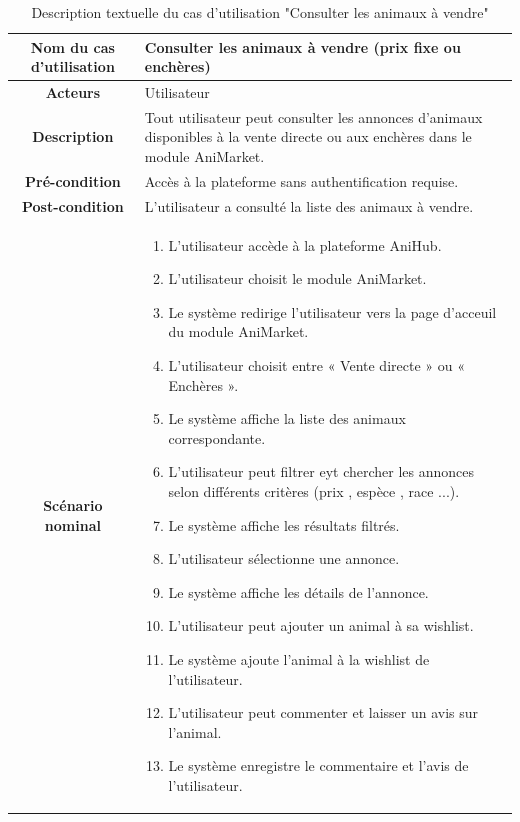 \begin{longtable}{|c|p{11cm}|}
\caption{Description textuelle du cas d’utilisation "Consulter les animaux à vendre"}
\label{tab:consulter_animaux_vente} \\
\hline
\cellcolor{coloranimarket} \textbf{Nom du cas d'utilisation } & Consulter les animaux à vendre (prix fixe ou enchères) \\
\hline
\cellcolor{coloranimarket} \textbf{Acteurs} & Utilisateur \\
\hline
\cellcolor{coloranimarket} \textbf{Description } & Tout utilisateur peut consulter les annonces d’animaux disponibles à la vente directe ou aux enchères dans le module AniMarket. \\
\hline
\cellcolor{coloranimarket} \textbf{Pré-condition } &  Accès à la plateforme sans authentification requise. \\
\hline
\cellcolor{coloranimarket} \textbf{Post-condition } & L’utilisateur a consulté la liste des animaux à vendre. \\
\hline
\cellcolor{coloranimarket} \textbf{Scénario nominal } & 
\begin{enumerate} 

\item L’utilisateur accède à la plateforme AniHub.
\item L’utilisateur choisit le module AniMarket.
\item Le système redirige l’utilisateur vers la page d'acceuil du  module AniMarket.
\item L’utilisateur choisit entre « Vente directe » ou « Enchères ».
\item Le système affiche la liste des animaux correspondante.
\item L’utilisateur peut filtrer eyt chercher les annonces selon différents critères (prix , espèce , race ...).
\item Le système affiche les résultats filtrés.
\item L’utilisateur sélectionne une annonce.
\item Le système affiche les détails de l’annonce. 
\item L’utilisateur peut ajouter un animal à sa wishlist.
\item Le système ajoute l’animal à la wishlist de l’utilisateur.
\item L’utilisateur peut commenter et laisser un avis sur l’animal.
\item Le système enregistre le commentaire et l’avis de l’utilisateur.
\end{enumerate} \\
\hline
\end{longtable}

